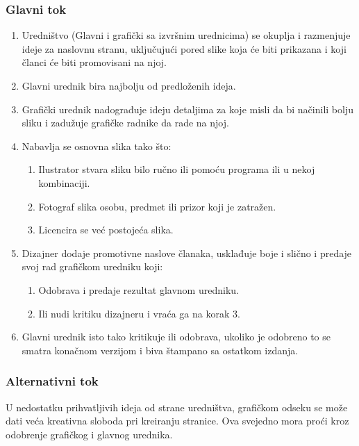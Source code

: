 \subsubsection{Glavni tok}
\begin{enumerate} 
\item Uredništvo (Glavni i grafički sa izvršnim urednicima) se okuplja i razmenjuje ideje za naslovnu stranu,
 uključujući pored slike koja će biti prikazana i koji članci će biti promovisani na njoj.
\item Glavni urednik bira najbolju od predloženih ideja.
\item Grafički urednik nadograđuje ideju detaljima za koje misli da bi načinili bolju sliku i zadužuje grafičke radnike da rade na njoj.
\item Nabavlja se osnovna slika tako što:
\begin{enumerate}
\item Ilustrator stvara sliku bilo ručno ili pomoću programa ili u nekoj kombinaciji.
\item Fotograf slika osobu, predmet ili prizor koji je zatražen.
\item Licencira se već postojeća slika.
\end{enumerate}
\item Dizajner dodaje promotivne naslove članaka, usklađuje boje i slično i predaje svoj rad grafičkom uredniku koji:
\begin{enumerate}
\item Odobrava i predaje rezultat glavnom uredniku.
\item Ili nudi kritiku dizajneru i vraća ga na korak 3.
\end{enumerate}
\item Glavni urednik isto tako kritikuje ili odobrava, ukoliko je odobreno to se smatra konačnom verzijom i biva štampano sa ostatkom izdanja. 
\end{enumerate}
\subsubsection{Alternativni tok}
U nedostatku prihvatljivih ideja od strane uredništva, grafičkom odseku se može dati veća kreativna sloboda pri kreiranju stranice. Ova svejedno mora proći kroz odobrenje grafičkog i glavnog urednika.

